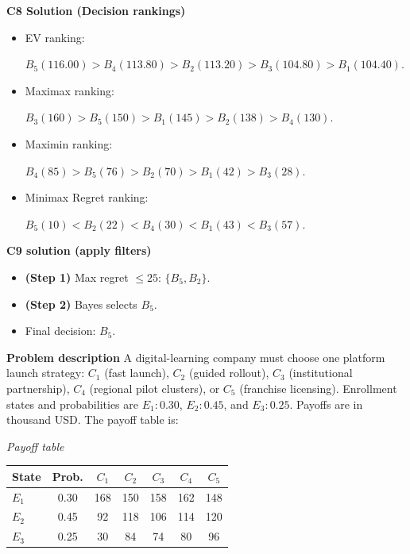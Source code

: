 \begin{ExamProblems}
		\textbf{C8 Solution (Decision rankings)}\par
		\begin{itemize}
			\item EV ranking: \par $B_5(116.00)>B_4(113.80)>B_2(113.20)>B_3(104.80)>B_1(104.40)$.
			\item Maximax ranking:\par $B_3(160)>B_5(150)>B_1(145)>B_2(138)>B_4(130)$.
			\item Maximin ranking: \par $B_4(85)>B_5(76)>B_2(70)>B_1(42)>B_3(28)$.
			\item Minimax Regret ranking:\par $B_5(10)<B_2(22)<B_4(30)<B_1(43)<B_3(57)$.
		\end{itemize}
		
		\textbf{C9 solution (apply filters)}\par
		\begin{itemize}
			\item \textbf{(Step 1)} Max regret $\leq 25$: $\{B_5,B_2\}$.
			\item \textbf{(Step 2)} Bayes selects $B_5$.
			\item Final decision: $B_5$.
		\end{itemize}
		
		\newpage
		\item
		\textbf{Problem description}
		A digital-learning company must choose one platform launch strategy: $C_1$ (fast launch), $C_2$ (guided rollout), $C_3$ (institutional partnership), $C_4$ (regional pilot clusters), or $C_5$ (franchise licensing).
		Enrollment states and probabilities are $E_1:0.30$, $E_2:0.45$, and $E_3:0.25$. Payoffs are in thousand USD. The payoff table is:
		
		\begin{center}
			\textit{Payoff table} \\
			\begin{tabular}{l c c c c c c}
				\hline
				State& Prob. & $C_1$ & $C_2$ & $C_3$ & $C_4$ & $C_5$ \\
				\hline
				$E_1$ & 0.30 & 168 & 150 & 158 & 162 & 148 \\
				$E_2$ & 0.45 & 92 & 118 & 106 & 114 & 120 \\
				$E_3$ & 0.25 & 30 & 84 & 74 & 80 & 96 \\
				\hline
			\end{tabular}
		\end{center}
		

\end{ExamProblems}
